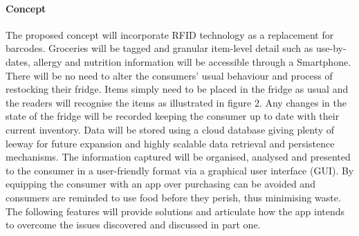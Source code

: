\documentclass[a4paper, 11pt]{article}
\begin{document}
\paragraph{Concept}The proposed concept will incorporate RFID technology as a replacement for barcodes. Groceries will be tagged and granular item-level detail such as use-by-dates, allergy and nutrition information will be accessible through a Smartphone. There will be no need to alter the consumers' usual behaviour and process of restocking their fridge. Items simply need to be placed in the fridge as usual and the readers will recognise the items as illustrated in figure 2. Any changes in the state of the fridge will be recorded keeping the consumer up to date with their current inventory. Data will be stored using a cloud database giving plenty of leeway for future expansion and highly scalable data retrieval and persistence mechanisms. The information captured will be organised, analysed and presented to the consumer in a user-friendly format via a graphical user interface (GUI). By equipping the consumer with an app over purchasing can be avoided and consumers are reminded to use food before they perish, thus minimising waste. The following features will provide solutions and articulate how the app intends to overcome the issues discovered and discussed in part one.

\vspace{\baselineskip}
\end{document}
